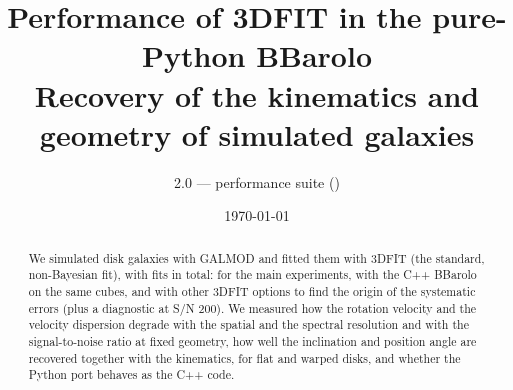 \documentclass[10pt,a4paper]{article}
\title{Performance of 3DFIT in the pure-Python BBarolo\\[2pt]
\large Recovery of the kinematics and geometry of simulated galaxies}
\author{\code{bbarolo} 2.0 --- performance suite (\code{pyBBarolo\_pure/performance})}
\date{\today}
\begin{document}
\maketitle

\begin{abstract}
\noindent
We simulated disk galaxies with GALMOD and fitted them with 3DFIT (the standard, non-Bayesian fit),
with \NAll{} fits in total: \NFits{} for the main experiments, \NCpp{} with the C++ BBarolo on the
same cubes, and \NMask{} with other 3DFIT options to find the origin of the systematic errors (plus a
diagnostic at S/N 200). We
measured how the rotation velocity and the velocity dispersion degrade with the spatial and the
spectral resolution and with the signal-to-noise ratio at fixed geometry, how well the inclination
and position angle are recovered together with the kinematics, for flat and warped disks, and
whether the Python port behaves as the C++ code.
\end{abstract}
\end{document}
